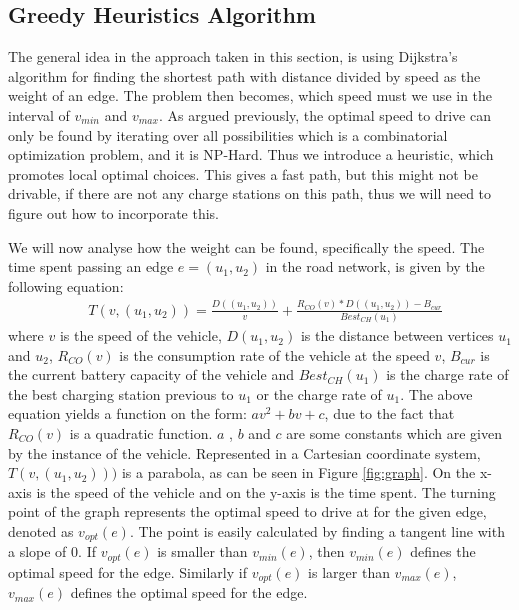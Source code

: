 \subsection{Greedy Heuristics Algorithm}

The general idea in the approach taken in this section, is using Dijkstra's algorithm for finding the shortest path with distance divided by speed as the weight of an edge. The problem then becomes, which speed must we use in the interval of $v_{min}$ and $v_{max}$. As argued previously, the optimal speed to drive can only be found by iterating over all possibilities which is a combinatorial optimization problem, and it is NP-Hard. Thus we introduce a heuristic, which promotes local optimal choices. This gives a fast path, but this might not be drivable, if there are not any charge stations on this path, thus we will need to figure out how to incorporate this.\

We will now analyse how the weight can be found, specifically the speed. The time spent passing an edge $e = (u_1, u_2)$ in the road network, is given by the following equation:
\begin{equation*}
\begin{aligned}
 & T(v,(u_1, u_2)) = \frac{D((u_1, u_2))}{v} + \frac{R_{CO}(v) * D((u_1, u_2)) - B_{cur}}{Best_{CH}(u_1)}
\end{aligned}
\end{equation*}\label{eq:drivingAndCharging}
where $v$ is the speed of the vehicle, $D(u_1, u_2)$ is the distance between vertices $u_1$ and $u_2$, $R_{CO}(v)$ is the consumption rate of the vehicle at the speed $v$, $B_{cur}$ is the current battery capacity of the vehicle and $Best_{CH}(u_1)$ is the charge rate of the best charging station previous to $u_1$ or the charge rate of $u_1$. The above equation yields a function on the form: $av^2 + bv + c$, due to the fact that $R_{CO}(v)$ is a quadratic function. $a$ , $b$ and $c$ are some constants which are given by the instance of the vehicle. 
Represented in a Cartesian coordinate system, $T(v,(u_1, u_2)))$ is a parabola, as can be seen in Figure \ref{fig:graph}. On the x-axis is the speed of the vehicle and on the y-axis is the time spent. The turning point of the graph represents the optimal speed to drive at for the given edge, denoted as $v_{opt}(e)$. The point is easily calculated by finding a tangent line with a slope of $0$. If $v_{opt}(e)$ is smaller than $v_{min}(e)$, then $v_{min}(e)$ defines the optimal speed for the edge. Similarly if $v_{opt}(e)$ is larger than $v_{max}(e)$, $v_{max}(e)$ defines the optimal speed for the edge.

